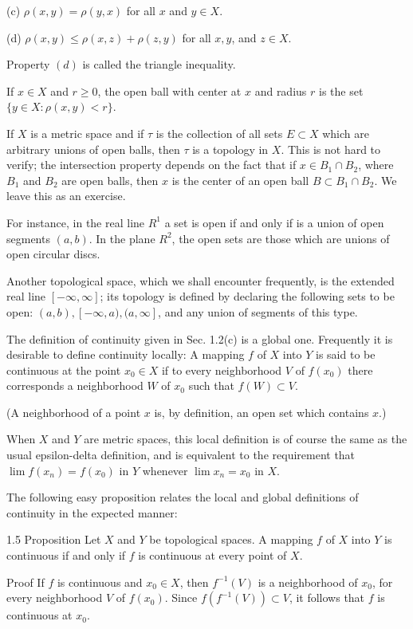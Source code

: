 \documentclass[10pt]{article}
\begin{document}
(c) $\rho(x, y)=\rho(y, x)$ for all $x$ and $y \in X$.

(d) $\rho(x, y) \leq \rho(x, z)+\rho(z, y)$ for all $x, y$, and $z \in X$.

Property $(d)$ is called the triangle inequality.

If $x \in X$ and $r \geq 0$, the open ball with center at $x$ and radius $r$ is the set $\{y \in X: \rho(x, y)<r\}$.

If $X$ is a metric space and if $\tau$ is the collection of all sets $E \subset X$ which are arbitrary unions of open balls, then $\tau$ is a topology in $X$. This is not hard to verify; the intersection property depends on the fact that if $x \in B_{1} \cap B_{2}$, where $B_{1}$ and $B_{2}$ are open balls, then $x$ is the center of an open ball $B \subset B_{1} \cap B_{2}$. We leave this as an exercise.

For instance, in the real line $R^{1}$ a set is open if and only if is a union of open segments $(a, b)$. In the plane $R^{2}$, the open sets are those which are unions of open circular discs.

Another topological space, which we shall encounter frequently, is the extended real line $[-\infty, \infty]$; its topology is defined by declaring the following sets to be open: $(a, b),[-\infty, a),(a, \infty]$, and any union of segments of this type.

The definition of continuity given in Sec. 1.2(c) is a global one. Frequently it is desirable to define continuity locally: A mapping $f$ of $X$ into $Y$ is said to be continuous at the point $x_{0} \in X$ if to every neighborhood $V$ of $f\left(x_{0}\right)$ there corresponds a neighborhood $W$ of $x_{0}$ such that $f(W) \subset V$.

(A neighborhood of a point $x$ is, by definition, an open set which contains $x$.)

When $X$ and $Y$ are metric spaces, this local definition is of course the same as the usual epsilon-delta definition, and is equivalent to the requirement that $\lim f\left(x_{n}\right)=f\left(x_{0}\right)$ in $Y$ whenever $\lim x_{n}=x_{0}$ in $X$.

The following easy proposition relates the local and global definitions of continuity in the expected manner:

1.5 Proposition Let $X$ and $Y$ be topological spaces. A mapping $f$ of $X$ into $Y$ is continuous if and only if $f$ is continuous at every point of $X$.

Proof If $f$ is continuous and $x_{0} \in X$, then $f^{-1}(V)$ is a neighborhood of $x_{0}$, for every neighborhood $V$ of $f\left(x_{0}\right)$. Since $f\left(f^{-1}(V)\right) \subset V$, it follows that $f$ is continuous at $x_{0}$.
\end{document}
